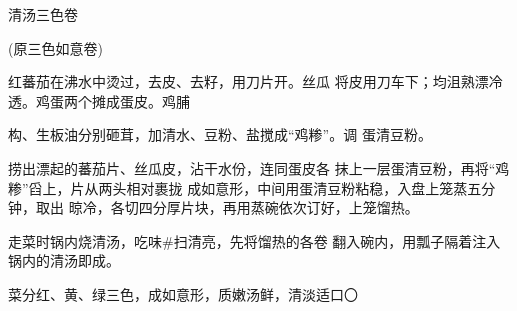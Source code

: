 \begin{recipe}{清汤三色卷}

(原三色如意卷)

\ingredients


\cooking

\step 红蕃茄在沸水中烫过，去皮、去籽，用刀片开。丝瓜 将皮用刀车下；均沮熟漂冷透。鸡蛋两个摊成蛋皮。鸡脯

构、生板油分别砸茸，加清水、豆粉、盐搅成“鸡糁”。调 蛋清豆粉。

\step 捞出漂起的蕃茄片、丝瓜皮，沾干水份，连同蛋皮各 抹上一层蛋清豆粉，再将“鸡糁”舀上，片从两头相对裹拢 成如意形，中间用蛋清豆粉粘稳，入盘上笼蒸五分钟，取出 晾冷，各切四分厚片块，再用蒸碗依次订好，上笼馏热。

\step 走菜时锅内烧清汤，吃味#扫清亮，先将馏热的各卷 翻入碗内，用瓢子隔着注入锅内的清汤即成。

\notes

菜分红、黄、绿三色，成如意形，质嫩汤鲜，清淡适口〇

\end{recipe}

